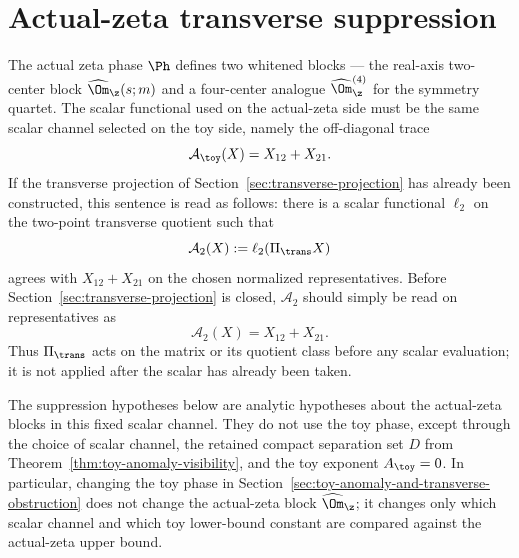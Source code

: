 %

\section{Actual-zeta transverse suppression}
\label{sec:actual-zeta-transverse-suppression}
\quad
{}\quad
{}\quad
{}\quad
{}\quad
{}
\par\medskip

The actual zeta phase \(\Ph\) defines two whitened blocks --- the
real-axis two-center block \(\widehat\Om_\z(s;m)\) and a four-center
analogue \(\widehat\Om_\z^{(4)}\) for the symmetry quartet.  The scalar
functional used on the actual-zeta side must be the same scalar channel
selected on the toy side, namely the off-diagonal trace
\[
        \mathcal A_\toy(X)=X_{12}+X_{21}.
\]
If the transverse projection of Section~\ref{sec:transverse-projection}
has already been constructed, this sentence is read as follows: there is
a scalar functional \(\ell_2\) on the two-point transverse quotient such
that
\begin{equation}
\label{eq:A2-transverse-representative}
        \mathcal A_2(X):=\ell_2(\Pi_\trans X)
\end{equation}
agrees with \(X_{12}+X_{21}\) on the chosen normalized representatives.
Before Section~\ref{sec:transverse-projection} is closed, \(\mathcal A_2\)
should simply be read on representatives as
\begin{equation}
\label{eq:A2-representative-functional}
        \mathcal A_2(X)=X_{12}+X_{21}.
\end{equation}
Thus \(\Pi_\trans\) acts on the matrix or its quotient class before any
scalar evaluation; it is not applied after the scalar has already been
taken.

The suppression hypotheses below are analytic hypotheses about the
actual-zeta blocks in this fixed scalar channel.  They do not use the toy
phase, except through the choice of scalar channel, the retained compact
separation set \(D\) from Theorem~\ref{thm:toy-anomaly-visibility}, and
the toy exponent \(A_\toy=0\).  In particular, changing the toy phase in
Section~\ref{sec:toy-anomaly-and-transverse-obstruction} does not change
the actual-zeta block \(\widehat\Om_\z\); it changes only which scalar
channel and which toy lower-bound constant are compared against the
actual-zeta upper bound.

